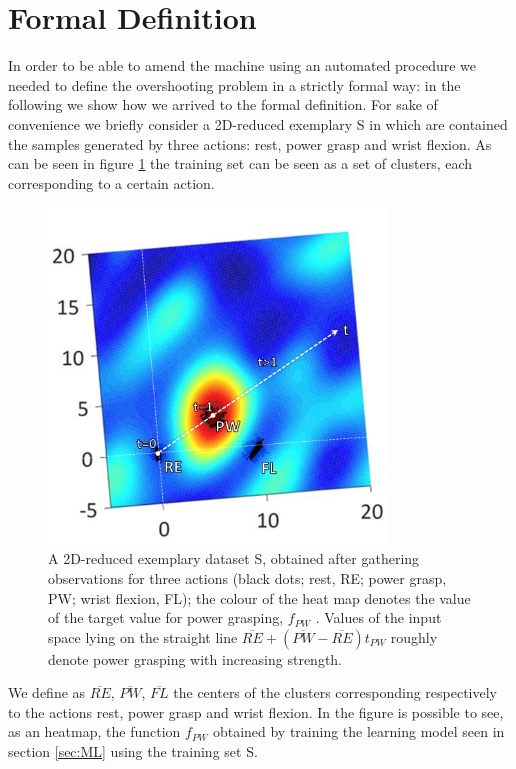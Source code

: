 \section{Formal Definition}\label{sec:pd-formal-def}
In order to be able to amend the machine using an automated procedure we needed to define the overshooting problem in a strictly formal way: in the following we show how we arrived to the formal definition.
For sake of convenience we briefly consider a 2D-reduced exemplary S in which are contained the samples generated by three actions: rest, power grasp and wrist flexion. As can be seen in figure \ref{fig:heatmap} the training set can be seen as a set of clusters, each corresponding to a certain action.
\begin{figure}[ht]
    \centering
    \includegraphics[width=0.8\textwidth]{Images/heatmap_DOF1.png}
    \caption{A 2D-reduced exemplary dataset S, obtained after gathering observations for three actions (black dots; rest, RE; power grasp, PW; wrist flexion, FL); the colour of the heat map denotes the value of the target value for power grasping, $f_{PW}$ . Values of the input space lying on the straight line $\overline{RE} + (\overline{PW} - \overline{RE})t_{PW}$ roughly denote power grasping with increasing strength.}
    \label{fig:heatmap}
\end{figure}
We define as $\overline{RE}$, $\overline{PW}$, $\overline{FL}$ the centers of the clusters corresponding respectively to the actions rest, power grasp and wrist flexion. In the figure is possible to see, as an heatmap, the function $f_{PW}$ obtained by training the learning model seen in section \ref{sec:ML} using the training set S.  
